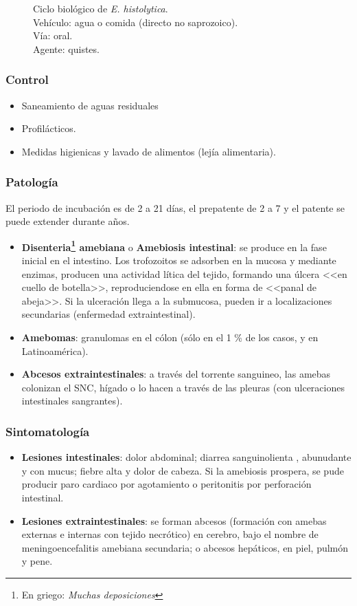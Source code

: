\begin{multicols}{2}
\begin{figure}[H]
		\caption[Ciclo biológico de \textit{E. histolytica}.]{Ciclo biológico de \textit{E. histolytica}.\\Vehículo: agua o comida (directo no saprozoico).\\Vía: oral.\\Agente: quistes. \label{fig:PARASIT:EHistolyticaCBios}}
	\end{figure}
\end{multicols}
\subsubsection{Control}
\begin{itemize}[itemsep=0pt,parsep=0pt,topsep=0pt,partopsep=0pt]
	\item Saneamiento de aguas residuales
	\item Profilácticos.
	\item Medidas higienicas y lavado de alimentos (lejía alimentaria).
\end{itemize}
\subsubsection{Patología}
El periodo de incubación es de 2 a 21 días, el prepatente de 2 a 7 y el patente se puede extender durante años.
\begin{itemize}[itemsep=0pt,parsep=0pt,topsep=0pt,partopsep=0pt]
	\item\textbf{Disenteria\footnote{En griego: \textit{Muchas deposiciones}} amebiana} o \textbf{Amebiosis intestinal}: se produce en la fase inicial en el intestino. Los trofozoitos se adsorben en la mucosa y mediante enzimas, producen una actividad lítica del tejido, formando una úlcera <<en cuello de botella>>, reproduciendose en ella en forma de <<panal de abeja>>. Si la ulceración llega a la submucosa, pueden ir a localizaciones secundarias (enfermedad extraintestinal).
	\item\textbf{Amebomas}: granulomas en el cólon (sólo en el 1 \% de los casos, y en Latinoamérica).
	\item\textbf{Abcesos extraintestinales}: a través del torrente sanguineo, las amebas colonizan el SNC, hígado o lo hacen a través de las pleuras (con ulceraciones intestinales sangrantes).
\end{itemize}
\subsubsection{Sintomatología} 
\begin{itemize}[itemsep=0pt,parsep=0pt,topsep=0pt,partopsep=0pt]
	\item\textbf{Lesiones intestinales}: dolor abdominal; diarrea sanguinolienta , abunudante y con mucus; fiebre alta y dolor de cabeza. Si la amebiosis prospera, se pude producir paro cardiaco por agotamiento o peritonitis por perforación intestinal.
	\item\textbf{Lesiones extraintestinales}: se forman abcesos (formación con amebas externas e internas con tejido necrótico) en cerebro, bajo el nombre de meningoencefalitis amebiana secundaria; o abcesos hepáticos, en piel, pulmón y pene.
\end{itemize}
